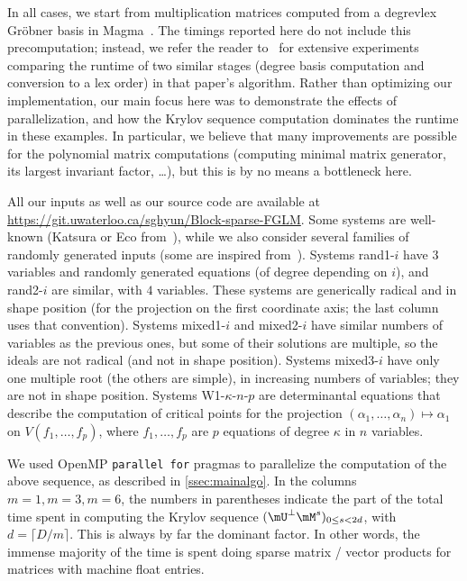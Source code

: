 \documentclass[12pt]{article}
\begin{document}
In all cases, we start from multiplication matrices computed from a
{degrevlex} Gr\"obner basis in Magma~\cite{BoCaPl97}. The timings
reported here do not include this precomputation; instead, we refer
the reader to~\cite{FaMo17} for extensive experiments comparing the
runtime of two similar stages (degree basis computation and conversion
to a lex order) in that paper's algorithm.  Rather than optimizing our
implementation, our main focus here was to demonstrate the effects of
parallelization, and how the Krylov sequence computation dominates the
runtime in these examples. In particular, we believe that many
improvements are possible for the polynomial matrix computations
(computing minimal matrix generator, its largest invariant factor,
\dots), but this is by no means a bottleneck here.

All our inputs as well as our source code are available at
\url{https://git.uwaterloo.ca/sghyun/Block-sparse-FGLM}. Some systems
are well-known (Katsura or Eco from~\cite{Morgan88}), while we also
consider several families of randomly generated inputs (some are
inspired from~\cite{FaMo17}). Systems rand1-$i$ have $3$ variables and
randomly generated equations (of degree depending on $i$), and
rand2-$i$ are similar, with $4$ variables. These systems are
generically radical and in shape position (for the projection on the
first coordinate axis; the last column uses that
convention). Systems mixed1-$i$ and mixed2-$i$ have similar numbers of
variables as the previous ones, but some of their solutions are
multiple, so the ideals are not radical (and not in shape
position). Systems mixed3-$i$ have only one multiple root (the others
are simple), in increasing numbers of variables; they are not in shape
position. Systems W1-$\kappa$-$n$-$p$ are determinantal equations that
describe the computation of critical points for the projection $
(\alpha_1,\dots,\alpha_n) \mapsto \alpha_1$ on $V(f_1,\dots,f_p)$,
where $f_1,\dots,f_p$ are $p$ equations of degree $\kappa$ in $n$
variables.


We used OpenMP {\tt parallel
  for} pragmas to parallelize the computation of the above sequence,
as described in \cref{ssec:mainalgo}.
In the columns $m=1,m=3,m=6$, the numbers in parentheses indicate the
part of the total time spent in computing the Krylov sequence
$(\mU^{\perp} \mM^s)_{0 \le s< 2d}$, with $d=\lceil D/m\rceil$. This is
always by far the dominant factor.  In other words, the immense
majority of the time is spent doing sparse matrix / vector products
for matrices with machine float entries. 
\end{document}
